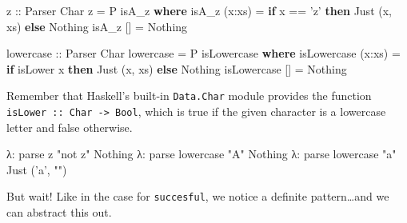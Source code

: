 \documentclass[]{article}
\newenvironment{Shaded}{}{}
\newcommand{\CharTok}[1]{\textcolor[rgb]{0.25,0.44,0.63}{#1}}
\newcommand{\DataTypeTok}[1]{\textcolor[rgb]{0.56,0.13,0.00}{#1}}
\newcommand{\FunctionTok}[1]{\textcolor[rgb]{0.02,0.16,0.49}{#1}}
\newcommand{\KeywordTok}[1]{\textcolor[rgb]{0.00,0.44,0.13}{\textbf{#1}}}
\newcommand{\NormalTok}[1]{#1}
\newcommand{\OtherTok}[1]{\textcolor[rgb]{0.00,0.44,0.13}{#1}}
\newcommand{\StringTok}[1]{\textcolor[rgb]{0.25,0.44,0.63}{#1}}
\begin{document}
\begin{Shaded}
\begin{Highlighting}[]
\OtherTok{z ::} \DataTypeTok{Parser} \DataTypeTok{Char}
\NormalTok{z }\FunctionTok{=} \DataTypeTok{P}\NormalTok{ isA_z}
    \KeywordTok{where}
\NormalTok{        isA_z (x}\FunctionTok{:}\NormalTok{xs) }\FunctionTok{=}  \KeywordTok{if}\NormalTok{ x }\FunctionTok{==} \CharTok{'z'}
                            \KeywordTok{then} \DataTypeTok{Just}\NormalTok{ (x, xs)}
                            \KeywordTok{else} \DataTypeTok{Nothing}
\NormalTok{        isA_z []     }\FunctionTok{=}  \DataTypeTok{Nothing}

\OtherTok{lowercase ::} \DataTypeTok{Parser} \DataTypeTok{Char}
\NormalTok{lowercase }\FunctionTok{=} \DataTypeTok{P}\NormalTok{ isLowercase}
    \KeywordTok{where}
\NormalTok{        isLowercase (x}\FunctionTok{:}\NormalTok{xs)  }\FunctionTok{=}   \KeywordTok{if}\NormalTok{ isLower x}
                                    \KeywordTok{then} \DataTypeTok{Just}\NormalTok{ (x, xs)}
                                    \KeywordTok{else} \DataTypeTok{Nothing}
\NormalTok{        isLowercase []      }\FunctionTok{=}   \DataTypeTok{Nothing}
\end{Highlighting}
\end{Shaded}

Remember that Haskell's built-in \texttt{Data.Char} module provides the function
\texttt{isLower\ ::\ Char\ -\textgreater{}\ Bool}, which is true if the given
character is a lowercase letter and false otherwise.

\begin{Shaded}
\begin{Highlighting}[]
\NormalTok{λ}\FunctionTok{:}\NormalTok{ parse z }\StringTok{"not z"}
\DataTypeTok{Nothing}
\NormalTok{λ}\FunctionTok{:}\NormalTok{ parse lowercase }\StringTok{"A"}
\DataTypeTok{Nothing}
\NormalTok{λ}\FunctionTok{:}\NormalTok{ parse lowercase }\StringTok{"a"}
\DataTypeTok{Just}\NormalTok{ (}\CharTok{'a'}\NormalTok{, }\StringTok{""}\NormalTok{)}
\end{Highlighting}
\end{Shaded}

But wait! Like in the case for \texttt{succesful}, we notice a definite
pattern\ldots{}and we can abstract this out.
\end{document}
